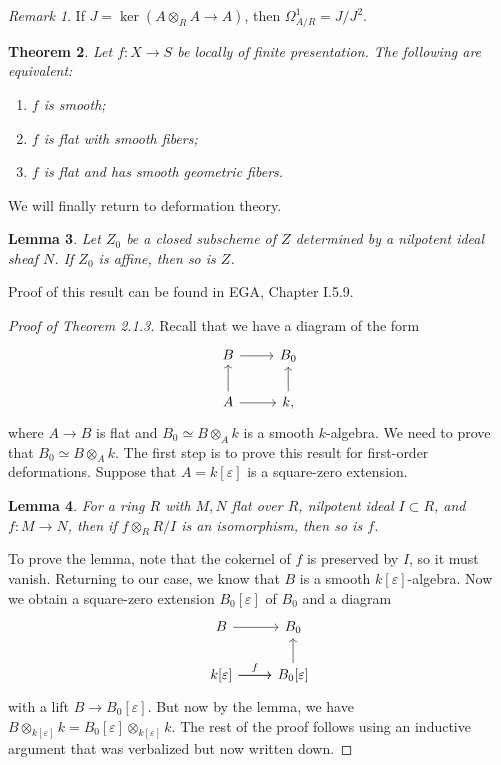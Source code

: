 \documentclass[leqno, openany]{memoir}
\newtheorem{thm}{Theorem}[section]
\newtheorem{lem}[thm]{Lemma}
\theoremstyle{definition}
\theoremstyle{remark}
\newtheorem{rmk}[thm]{Remark}
\theoremstyle{plain}
\theoremstyle{definition}
\theoremstyle{remark}
\newcommand{\ep}{\varepsilon}
\begin{document}
\begin{rmk}
    If $J = \ker(A \otimes_R A \to A)$, then $\Omega^1_{A/R} = J/J^2$.
\end{rmk}

\begin{thm}
    Let $f \colon X \to S$ be locally of finite presentation. The following are equivalent:
    \begin{enumerate}
        \item $f$ is smooth;
        \item $f$ is flat with smooth fibers;
        \item $f$ is flat and has smooth geometric fibers.
    \end{enumerate}
\end{thm}

We will finally return to deformation theory.

\begin{lem}
    Let $Z_0$ be a closed subscheme of $Z$ determined by a nilpotent ideal sheaf $N$. If $Z_0$ is affine, then so is $Z$.
\end{lem}
Proof of this result can be found in EGA, Chapter I.5.9. 

\begin{proof}[Proof of Theorem 2.1.3]
    Recall that we have a diagram of the form
    \begin{equation*}
    \begin{tikzcd}
        B \ar{r} & B_0 \\
        A \ar{u} \ar{r} & k \ar{u},
    \end{tikzcd}
    \end{equation*}
    where $A \to B$ is flat and $B_0 \simeq B \otimes_A k$ is a smooth $k$-algebra. We need to prove that $B_0 \simeq B \otimes_A k$. The first step is to prove this result for first-order deformations. Suppose that $A = k[\ep]$ is a square-zero extension. 
    \begin{lem}
        For a ring $R$ with $M, N$ flat over $R$, nilpotent ideal $I \subset R$, and $f \colon M \to N$, then if $f \otimes_R R/I$ is an isomorphism, then so is $f$.
    \end{lem}
    To prove the lemma, note that the cokernel of $f$ is preserved by $I$, so it must vanish. Returning to our case, we know that $B$ is a smooth $k[\ep]$-algebra. Now we obtain a square-zero extension $B_0[\ep]$ of $B_0$ and a diagram
    \begin{equation*}
    \begin{tikzcd}
        B \ar{r} & B_0 \\
        k[\ep] \ar{r}{f} \ar{r} & B_0[\ep] \ar{u}
    \end{tikzcd}
    \end{equation*}
    with a lift $B \to B_0[\ep]$. But now by the lemma, we have $B \otimes_{k[\ep]} k = B_0[\ep] \otimes_{k[\ep]} k$. The rest of the proof follows using an inductive argument that was verbalized but now written down.
\end{proof}
\end{document}
